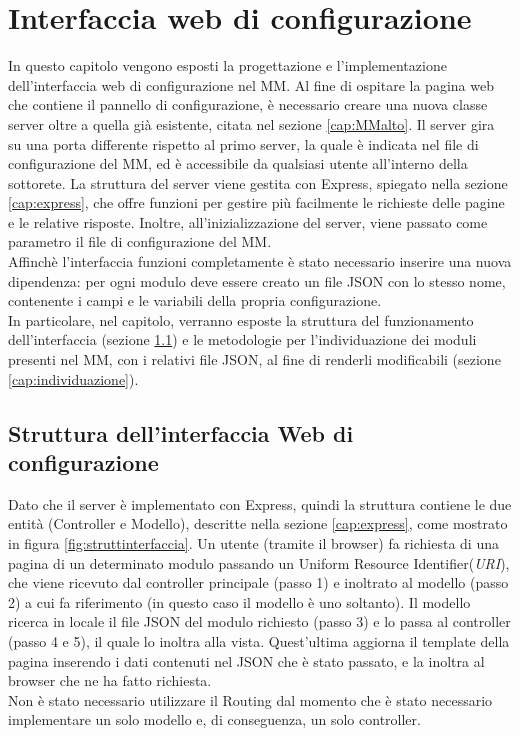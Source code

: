 \chapter{Interfaccia web di configurazione}\label{capitolo5}
In questo capitolo vengono esposti la progettazione e l'implementazione dell'interfaccia web di configurazione
nel MM.
Al fine di ospitare la pagina web che contiene il pannello di configurazione, \`e necessario
creare una nuova classe server oltre a quella gi\`a esistente, citata nel sezione \ref{cap:MMalto}.
Il server gira su una porta differente rispetto al primo server, la quale è indicata nel file di configurazione del MM,
ed \`e accessibile da qualsiasi utente all'interno della sottorete.
La struttura del server viene gestita con Express, spiegato nella sezione \ref{cap:express}, che offre funzioni per gestire
pi\`u facilmente le richieste delle pagine e le relative risposte.
Inoltre, all'inizializzazione del server, viene passato come parametro il file di configurazione del
MM.\\
Affinch\`e l'interfaccia funzioni completamente \`e stato necessario inserire una nuova dipendenza:
per ogni modulo deve essere creato un file JSON con lo stesso nome,
contenente i campi e le variabili della propria configurazione.\\
In particolare, nel capitolo, verranno esposte la struttura del funzionamento dell'interfaccia (sezione \ref{cap:strutturainterfaccia}) e le metodologie per
l'individuazione dei moduli
presenti nel MM, con i relativi file JSON, al fine di renderli modificabili (sezione \ref{cap:individuazione}).\\[1\baselineskip]

\section{Struttura dell'interfaccia Web di configurazione}\label{cap:strutturainterfaccia}
Dato che il server \`e implementato con Express, quindi la struttura
contiene le due entit\`a (Controller e Modello), descritte nella sezione \ref{cap:express}, come mostrato
in figura \ref{fig:struttinterfaccia}.
Un utente (tramite il browser) fa richiesta di una pagina di un determinato modulo passando un Uniform Resource Identifier(\textit{URI}),
che viene ricevuto dal controller principale (passo 1) e inoltrato al modello (passo 2) a cui fa riferimento (in questo caso il modello
\`e uno soltanto). Il modello ricerca in locale il file JSON del modulo richiesto (passo 3) e lo passa al controller (passo 4 e 5), il quale lo
inoltra alla vista.
Quest'ultima aggiorna il template della pagina inserendo i dati contenuti nel JSON che \`e stato passato, e la inoltra al browser che ne ha fatto richiesta.\\
Non \`e stato necessario utilizzare il Routing dal momento che \`e stato necessario
implementare un solo modello e, di conseguenza, un solo controller.\\[1\baselineskip]


